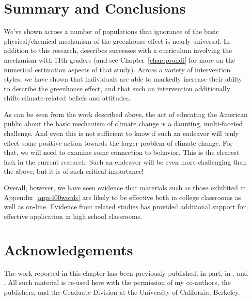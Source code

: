 \section{Summary and Conclusions}

We've shown across a number of populations that ignorance of the basic
physical/chemical mechanism of the greenhouse effect is nearly universal. In
addition to this research, \textcite{felipe_numerical_2012} describes successes
with a curriculum involving the mechanism with 11th graders (and see
Chapter~\ref{chap:prondi} for more on the numerical estimation aspects of that
study). Across a variety of intervention styles, we have shown that individuals
are able to markedly increase their abilty to describe the greenhouse effect,
and that such an intervention additionally shifts climate-related beliefs and
attitudes.


As can be seen from the work described above, the act of educating the American
public about the basic mechanism of climate change is a daunting, multi-faceted
challenge. And even this is not sufficient to know if such an endeavor will
truly effect some positive action towards the larger problem of climate change.
For that, we will need to examine some connection to behavior. This is the
clearest lack in the current research. Such an endeavor will be even more
challenging than the above, but it is of such critical importance! 

Overall, however, we have seen evidence that materials such as those exhibited
in Appendix~\ref{app:400words} are likely to be effective both in college
classrooms as well as on-line. Evidence from related studies has provided
additional support for effective application in high school classrooms.



\section*{Acknowledgements}

The work reported in this chapter has been previously published, in part, in
\textcite{ranney_changing_2012,ranney_improving_2012_f}, and
\textcite{clark_knowledge_inpress}.  All such material is re-used here with the
permission of my co-authors, the publishers, and the Graduate Division at the
University of California, Berkeley.
